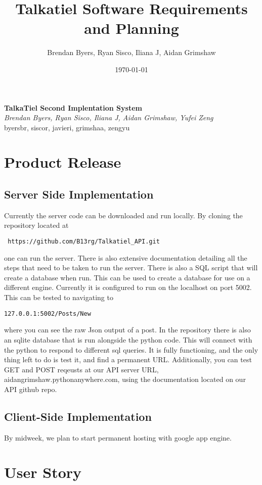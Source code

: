 \documentclass[12pt]{article}
\title{Talkatiel Software Requirements and Planning}
\author{Brendan Byers, Ryan Sisco, Iliana J, Aidan Grimshaw}
\date{\today}
\begin{document}
\begin{center}
 \Large\textbf{TalkaTiel Second Implentation System}\\
 \large\textit{Brendan Byers, Ryan Sisco, Iliana J, Aidan Grimshaw, Yufei Zeng}\\
 \large{byersbr, siscor, javieri, grimshaa, zengyu}\\
\end{center}

\tableofcontents
\section{Product Release} \subsection{Server Side Implementation} Currently the
server code can be downloaded and run locally.  By cloning the repository
located at\begin{verbatim} https://github.com/B13rg/Talkatiel_API.git
\end{verbatim}one can run the server.  There is also extensive documentation
detailing all the steps that need to be taken to run the server.  There is also
a SQL script that will create a database when run.  This can be used to create a
database for use on a different engine.  Currently it is configured to run on
the localhost on port 5002.  This can be tested to navigating to
\begin{verbatim}127.0.0.1:5002/Posts/New \end{verbatim}where you can see the raw
Json output of a post.  In the repository there is also an sqlite database that
is run alongside the python code.  This will connect with the python to respond
to different sql queries.  It is fully functioning, and the only thing left to
do is test it, and find a permanent URL. Additionally, you can test GET and POST
reqeusts at our API server URL, aidangrimshaw.pythonanywhere.com, using the
documentation located on our API github repo.

\subsection{Client-Side Implementation}
By midweek, we plan to start permanent
hosting with google app engine.

\section{User Story}
\end{document}
